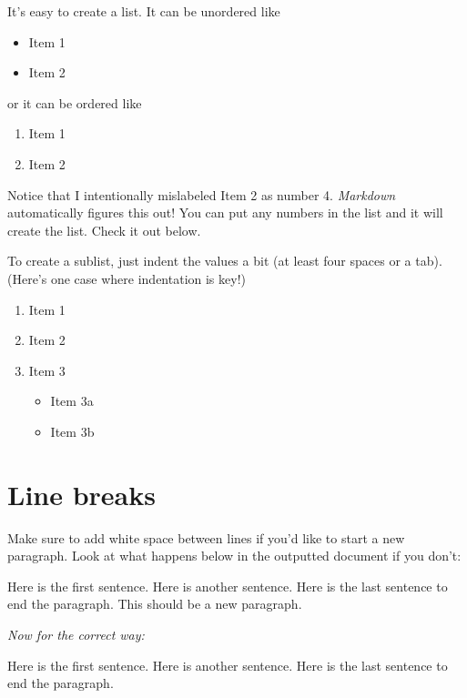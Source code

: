 \documentclass[print]{nuthesis}
\providecommand{\tightlist}{%
  \setlength{\itemsep}{0pt}\setlength{\parskip}{0pt}}
\begin{document}
It's easy to create a list. It can be unordered like

\begin{itemize}
\tightlist
\item
  Item 1
\item
  Item 2
\end{itemize}

or it can be ordered like

\begin{enumerate}
\def\labelenumi{\arabic{enumi}.}
\tightlist
\item
  Item 1
\item
  Item 2
\end{enumerate}

Notice that I intentionally mislabeled Item 2 as number 4. \emph{Markdown} automatically figures this out! You can put any numbers in the list and it will create the list. Check it out below.

To create a sublist, just indent the values a bit (at least four spaces or a tab). (Here's one case where indentation is key!)

\begin{enumerate}
\def\labelenumi{\arabic{enumi}.}
\tightlist
\item
  Item 1
\item
  Item 2
\item
  Item 3

  \begin{itemize}
  \tightlist
  \item
    Item 3a
  \item
    Item 3b
  \end{itemize}
\end{enumerate}

\hypertarget{line-breaks}{%
\section{Line breaks}\label{line-breaks}}

Make sure to add white space between lines if you'd like to start a new paragraph. Look at what happens below in the outputted document if you don't:

Here is the first sentence. Here is another sentence. Here is the last sentence to end the paragraph.
This should be a new paragraph.

\emph{Now for the correct way:}

Here is the first sentence. Here is another sentence. Here is the last sentence to end the paragraph.
\end{document}
